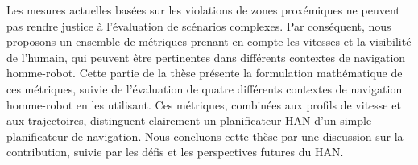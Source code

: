 Les mesures actuelles basées sur les violations de zones proxémiques ne peuvent pas rendre justice à l'évaluation de scénarios complexes. Par conséquent, nous proposons un ensemble de métriques prenant en compte les vitesses et la visibilité de l'humain, qui peuvent être pertinentes dans différents contextes de navigation homme-robot. Cette partie de la thèse présente la formulation mathématique de ces métriques, suivie de l'évaluation de quatre différents contextes de navigation homme-robot en les utilisant. Ces métriques, combinées aux profils de vitesse et aux trajectoires, distinguent clairement un planificateur HAN d'un simple planificateur de navigation. Nous concluons cette thèse par une discussion sur la contribution, suivie par les défis et les perspectives futures du HAN.





